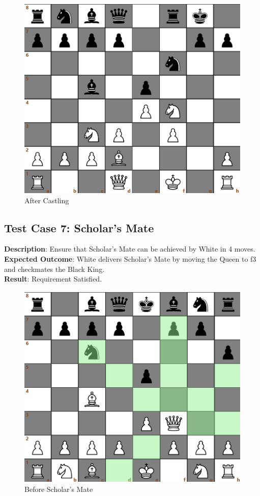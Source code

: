 \documentclass[a4paper,12pt]{article}
\begin{document}
\begin{figure}[H]
    \centering
    \includegraphics[width=0.7\linewidth]{Images/Test Cases/testCase6Img2.png}
    \caption{After Castling}
    \label{fig:AfterCastling}
\end{figure}

\subsection{Test Case 7: Scholar's Mate}
\textbf{Description}: Ensure that Scholar's Mate can be achieved by White in 4 moves.\\
\textbf{Expected Outcome}: White delivers Scholar's Mate by moving the Queen to f3 and checkmates the Black King.\\
\textbf{Result}: Requirement Satisfied.

\begin{figure}[H]
    \centering
    \includegraphics[width=0.7\linewidth]{Images/Test Cases/testCase7Img1.png}
    \caption{Before Scholar's Mate}
    \label{fig:BeforeScholarsMate}
\end{figure}
\end{document}
